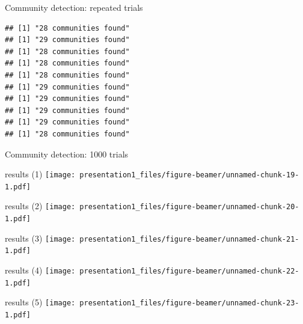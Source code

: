 \documentclass[
  ignorenonframetext,
]{beamer}
\begin{document}
\begin{frame}[fragile]{Community detection: repeated trials}
\protect\hypertarget{community-detection-repeated-trials}{}
\begin{verbatim}
## [1] "28 communities found"
## [1] "29 communities found"
## [1] "28 communities found"
## [1] "28 communities found"
## [1] "28 communities found"
## [1] "29 communities found"
## [1] "29 communities found"
## [1] "29 communities found"
## [1] "29 communities found"
## [1] "28 communities found"
\end{verbatim}

\begin{block}{Community detection: 1000 trials}
\protect\hypertarget{community-detection-1000-trials}{}
\end{block}

\begin{block}{results (1)}
\protect\hypertarget{results-1}{}
\texttt{[image: presentation1\_files/figure-beamer/unnamed-chunk-19-1.pdf]}
\end{block}

\begin{block}{results (2)}
\protect\hypertarget{results-2}{}
\texttt{[image: presentation1\_files/figure-beamer/unnamed-chunk-20-1.pdf]}
\end{block}

\begin{block}{results (3)}
\protect\hypertarget{results-3}{}
\texttt{[image: presentation1\_files/figure-beamer/unnamed-chunk-21-1.pdf]}
\end{block}

\begin{block}{results (4)}
\protect\hypertarget{results-4}{}
\texttt{[image: presentation1\_files/figure-beamer/unnamed-chunk-22-1.pdf]}
\end{block}

\begin{block}{results (5)}
\protect\hypertarget{results-5}{}
\texttt{[image: presentation1\_files/figure-beamer/unnamed-chunk-23-1.pdf]}
\end{block}
\end{frame}
\end{document}
